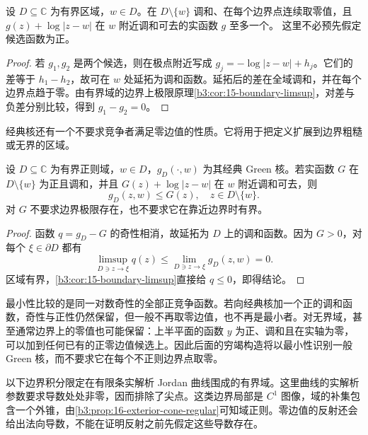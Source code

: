 \begin{proposition}[经典零边值核的唯一性]\label{b3:prop:17-green-uniqueness}
设 \(D\subseteq\mathbb C\) 为有界区域，\(w\in D\)。在
\(D\setminus\{w\}\) 调和、在每个边界点连续取零值，且
\(g(z)+\log|z-w|\) 在 \(w\) 附近调和可去的实函数 \(g\) 至多一个。
这里不必预先假定候选函数为正。
\end{proposition}
\begin{proof}
若 \(g_1,g_2\) 是两个候选，则在极点附近写成
\(g_j=-\log|z-w|+h_j\)。它们的差等于 \(h_1-h_2\)，故可在 \(w\) 处延拓为调和函数。延拓后的差在全域调和，并在每个边界点趋于零。由有界域的边界上极限原理\cref{b3:cor:15-boundary-limsup}，对差与负差分别比较，得到 \(g_1-g_2=0\)。
\end{proof}

经典核还有一个不要求竞争者满足零边值的性质。它将用于把定义扩展到边界粗糙或无界的区域。

\begin{proposition}\label{b3:prop:17-classical-green-minimal}
设 \(D\subseteq\mathbb C\) 为有界正则域，\(w\in D\)，\(g_D(\cdot,w)\) 为其经典 Green 核。若实函数 \(G\) 在 \(D\setminus\{w\}\) 为正且调和，并且 \(G(z)+\log|z-w|\) 在 \(w\) 附近调和可去，则
\[
 g_D(z,w)\le G(z),\quad z\in D\setminus\{w\}.
\]
对 \(G\) 不要求边界极限存在，也不要求它在靠近边界时有界。
\end{proposition}
\begin{proof}
函数 \(q=g_D-G\) 的奇性相消，故延拓为 \(D\) 上的调和函数。因为
\(G>0\)，对每个 \(\xi\in\partial D\) 都有
\[
 \limsup_{D\ni z\to\xi}q(z)
 \le\lim_{D\ni z\to\xi}g_D(z,w)=0.
\]
区域有界，\cref{b3:cor:15-boundary-limsup}直接给 \(q\le0\)，即得结论。
\end{proof}

最小性比较的是同一对数奇性的全部正竞争函数。若向经典核加一个正的调和函数，奇性与正性仍然保留，但一般不再取零边值，也不再是最小者。对无界域，甚至通常边界上的零值也可能保留：上半平面的函数
\(y\) 为正、调和且在实轴为零，可以加到任何已有的正零边值候选上。因此后面的穷竭构造将以最小性识别一般 Green 核，而不要求它在每个不正则边界点取零。

\ProseParagraphBreak
以下边界积分限定在有限条实解析 Jordan 曲线围成的有界域。这里曲线的实解析参数要求导数处处非零，因而排除了尖点。这类边界局部是 \(C^1\) 图像，域的补集包含一个外锥，由\cref{b3:prop:16-exterior-cone-regular}可知域正则。零边值的反射还会给出法向导数，不能在证明反射之前先假定这些导数存在。

